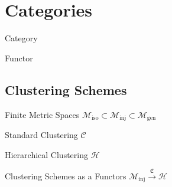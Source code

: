 \chapter{Categories}

\begin{definition}{Category}{}
\end{definition}

\begin{definition}{Functor}{}
\end{definition}

\section{Clustering Schemes}

\begin{definition}{Finite Metric Spaces}{}
$\mathscr{M}_\mathrm{iso} \subset \mathscr{M}_\mathrm{inj} \subset \mathscr{M}_\mathrm{gen}$
\end{definition}

\begin{definition}{Standard Clustering}{}
$\mathscr{C}$
\end{definition}

\begin{definition}{Hierarchical Clustering}{}
$\mathscr{H}$
\end{definition}

\begin{definition}{Clustering Schemes as a Functors}{}
$\mathscr{M}_\mathrm{inj} \overset{\mathfrak{C}}{\longrightarrow} \mathscr{H}$
\end{definition}